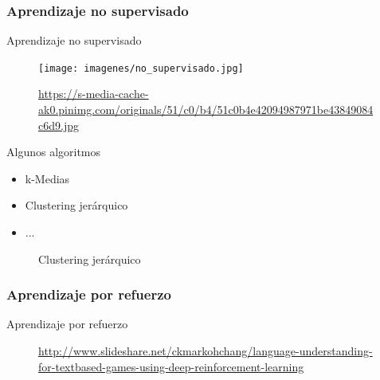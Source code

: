 \documentclass[hyperref={unicode}]{beamer}
\begin{document}
\subsubsection{Aprendizaje no supervisado}
\begin{frame}{Aprendizaje no supervisado}
	\begin{figure}
			\begin{center}
			\texttt{[image: imagenes/no\_supervisado.jpg]}
			\caption{\url{https://s-media-cache-ak0.pinimg.com/originals/51/c0/b4/51c0b4e42094987971be43849084c6d9.jpg}}
			\end{center}
	\end{figure}
\end{frame}

\begin{frame}{Algunos algoritmos}

\begin{minipage}{0.3\textwidth}
	\begin{itemize}
		\item k-Medias
		\item Clustering jerárquico
		\item ...
	\end{itemize}
\end{minipage}
\hfill
\begin{minipage}{0.65\textwidth}
	\begin{figure}[htbp!]
		\centering
		\caption{Clustering jerárquico}
	\end{figure}
\end{minipage}
	
\end{frame}



\subsubsection{Aprendizaje por refuerzo}
\begin{frame}{Aprendizaje por refuerzo}
	
	\begin{figure}[htbp!]
			\centering
			\caption{\url{http://www.slideshare.net/ckmarkohchang/language-understanding-for-textbased-games-using-deep-reinforcement-learning}}
		\end{figure}
\end{frame}
\end{document}

